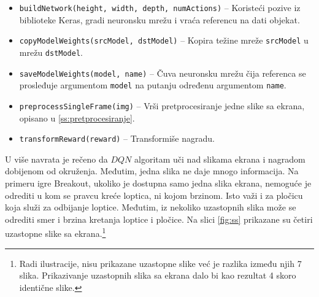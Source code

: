\begin{itemize}
	\item \texttt{buildNetwork(height, width, depth, numActions)} -- Koristeći pozive iz biblioteke Keras, gradi neuronsku mrežu i vraća referencu na dati objekat.
	\item \texttt{copyModelWeights(srcModel, dstModel)} -- Kopira težine mreže \texttt{srcModel} u mrežu \texttt{dstModel}.
	\item \texttt{saveModelWeights(model, name)} -- Čuva neuronsku mrežu čija referenca se prosleđuje argumentom \texttt{model} na putanju određenu argumentom \texttt{name}.
	\item \texttt{preprocessSingleFrame(img)} -- Vrši pretprocesiranje jedne slike sa ekrana, opisano u \ref{ss:pretprocesiranje}.
	\item \texttt{transformReward(reward)} -- Transformiše nagradu.
\end{itemize}
\par 
U više navrata je rečeno da $DQN$ algoritam uči nad slikama ekrana i nagradom dobijenom od okruženja. Međutim, jedna slika ne daje mnogo informacija. Na primeru igre Breakout, ukoliko je dostupna samo jedna slika ekrana, nemoguće je odrediti u kom se pravcu kreće loptica, ni kojom brzinom. Isto važi i za pločicu koja služi za odbijanje loptice. Međutim, iz nekoliko uzastopnih slika može se odrediti smer i brzina kretanja loptice i pločice. Na slici \ref{fig:ss} prikazane su četiri uzastopne slike sa ekrana.\footnote{Radi ilustracije, nisu prikazane uzastopne slike već je razlika između njih 7 slika. Prikazivanje uzastopnih slika sa ekrana dalo bi kao rezultat 4 skoro identične slike.} 

